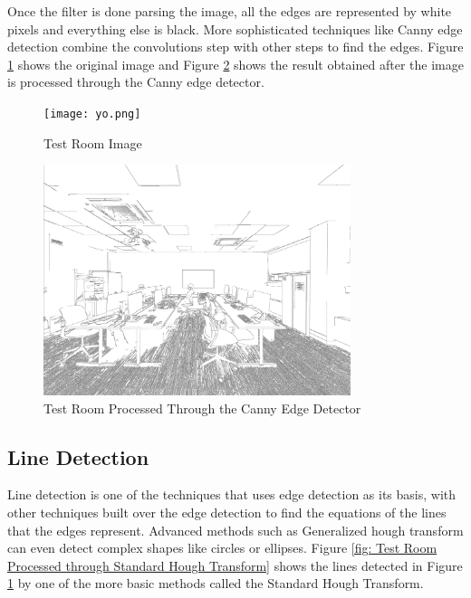 \documentclass[12pt]{report}
\begin{document}
Once the filter is done parsing the image, all the edges are represented by white pixels and everything else is black. More sophisticated techniques like Canny edge detection combine the convolutions step with other steps to find the edges. Figure \ref{fig: Test Room Image} shows the original image and Figure \ref{fig: Test Room Post processed through the Canny edge detector} shows the result obtained after the image is processed through the Canny edge detector.

\begin{figure}[H]
    \centering
    \texttt{[image: yo.png]}
    \caption{Test Room Image}
    \label{fig: Test Room Image}
\end{figure}

\begin{figure}[H]
    \centering
    \includegraphics[width=0.8\textwidth]{white_edge.png}
    \caption{Test Room Processed Through the Canny Edge Detector}
    \label{fig: Test Room Post processed through the Canny edge detector}
\end{figure}


\subsection{Line Detection}

Line detection is one of the techniques that uses edge detection as its basis, with other techniques built over the edge detection to find the equations of the lines that the edges represent. Advanced methods such as Generalized hough transform can even detect complex shapes like circles or ellipses. Figure \ref{fig: Test Room Processed through Standard Hough Transform} shows the lines detected in Figure \ref{fig: Test Room Image} by one of the more basic methods called the Standard Hough Transform.
\end{document}

